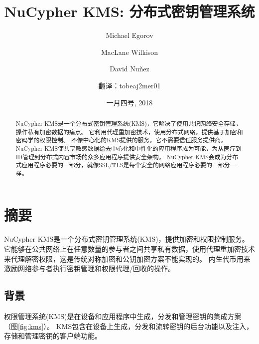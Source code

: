 \documentclass[longbibliography,nofootinbib]{revtex4-1}
\newcommand{\kms}{NuCypher KMS}
\begin{document}
\renewcommand{\tocname}{内容}
\renewcommand{\figurename}{图}
\newcommand{\figref}[1]{图\ref{#1}}

\title{\kms : 分布式密钥管理系统}

\author{Michael Egorov}
\author{MacLane Wilkison}

\author{David Nu{\~n}ez}
\date{一月四号, 2018}

\author{翻译：tobeaj2mer01}

\begin{abstract}
    \kms 是一个分布式密钥管理系统(KMS)，它解决了使用共识网络安全存储，操作私有加密数据的痛点\cite{cryptoeprint:2017:201}。
    它利用代理重加密技术，使用分布式网络，提供基于加密和密码学的权限控制\cite{wiki:pre}。
    不像中心化的KMS提供的服务，它不需要信任服务提供商。
    \kms 使共享敏感数据给去中心化和中性化的应用程序成为可能，为从医疗到ID管理到分布式内容市场的众多应用程序提供安全架构。
    \kms 会成为分布式应用程序必要的一部分，就像SSL/TLS是每个安全的网络应用程序必要的一部分一样。
\end{abstract}

\maketitle

\tableofcontents

\newpage

\section{摘要}

\kms 是一个分布式密钥管理系统(KMS)，提供加密和权限控制服务。
它能够在公共网络上在任意数量的参与者之间共享私有数据，使用代理重加密技术来代理解密权限，这是传统对称加密和公钥加密方案不能实现的。
内生代币用来激励网络参与者执行密钥管理和权限代理/回收的操作。

\subsection{背景}
权限管理系统(KMS)是在设备和应用程序中生成，分发和管理密钥的集成方案（\figref{fig:kms}）。
KMS包含在设备上生成，分发和流转密钥的后台功能以及注入，存储和管理密钥的客户端功能\cite{wiki:kms}。
\end{document}
